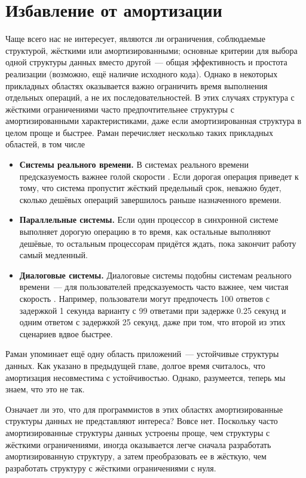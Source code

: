\chapter{Избавление от амортизации}
\label{ch:7}

Чаще всего нас не интересует, являются ли ограничения, соблюдаемые
структурой, жёсткими или амортизированными; основные критерии для
выбора одной структуры данных вместо другой~--- общая эффективность и
простота реализации (возможно, ещё наличие исходного кода). Однако в
некоторых прикладных областях оказывается важно ограничить время
выполнения отдельных операций, а не их последовательностей. В
этих случаях структура с жёсткими ограничениями часто предпочтительнее
структуры с амортизированными характеристиками, даже если
амортизированная структура в целом проще и быстрее. Раман
\cite{Raman1992} перечисляет несколько таких прикладных областей, в
том числе
\begin{itemize}
\item \textbf{Системы реального времени.} В системах реального времени
  предсказуемость важнее голой скорости \cite{Stankovic1988}. Если
  дорогая операция приведет к тому, что система пропустит жёсткий
  предельный срок, неважно будет, сколько дешёвых операций завершилось
  раньше назначенного времени.
\item \textbf{Параллельные системы.} Если один процессор в синхронной
  системе выполняет дорогую операцию в то время, как остальные
  выполняют дешёвые, то остальным процессорам придётся ждать, пока
  закончит работу самый медленный.
\item \textbf{Диалоговые системы.} Диалоговые системы подобны системам
  реального времени~--- для пользователей предсказуемость часто
  важнее, чем чистая скорость \cite{Butler1983}. Например,
  пользователи могут предпочесть 100 ответов с задержкой 1 секунда
  варианту с 99 ответами при задержке 0.25 секунд и одним ответом с
  задержкой 25 секунд, даже при том, что второй из этих сценариев
  вдвое быстрее.
\end{itemize}
\begin{remark}
  Раман упоминает ещё одну область приложений~--- устойчивые структуры
  данных. Как указано в предыдущей главе, долгое время считалось,
  что амортизация несовместима с устойчивостью. Однако, разумеется,
  теперь мы знаем, что это не так.
\end{remark}

Означает ли это, что для программистов в этих областях
амортизированные структуры данных не представляют интереса? Вовсе
нет. Поскольку часто амортизированные структуры данных устроены проще,
чем структуры с жёсткими ограничениями, иногда оказывается легче
сначала разработать амортизированную структуру, а затем преобразовать
ее в жёсткую, чем разработать структуру с жёсткими ограничениями с
нуля.

